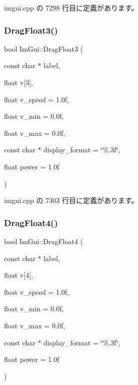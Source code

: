  imgui.\+cpp の 7298 行目に定義があります。

\mbox{\label{namespace_im_gui_a3a365703646c6fb5357f21a13c531bfe}} 
\subsubsection{\texorpdfstring{Drag\+Float3()}{DragFloat3()}}
{\footnotesize\ttfamily bool Im\+Gui\+::\+Drag\+Float3 (\begin{DoxyParamCaption}\item[{const char $\ast$}]{label,  }\item[{float}]{v\mbox{[}3\mbox{]},  }\item[{float}]{v\+\_\+speed = {\ttfamily 1.0f},  }\item[{float}]{v\+\_\+min = {\ttfamily 0.0f},  }\item[{float}]{v\+\_\+max = {\ttfamily 0.0f},  }\item[{const char $\ast$}]{display\+\_\+format = {\ttfamily \char`\"{}\%.3f\char`\"{}},  }\item[{float}]{power = {\ttfamily 1.0f} }\end{DoxyParamCaption})}



 imgui.\+cpp の 7303 行目に定義があります。

\mbox{\label{namespace_im_gui_a6dfd9e5d7adc6106e9391fc971d2f8bc}} 
\subsubsection{\texorpdfstring{Drag\+Float4()}{DragFloat4()}}
{\footnotesize\ttfamily bool Im\+Gui\+::\+Drag\+Float4 (\begin{DoxyParamCaption}\item[{const char $\ast$}]{label,  }\item[{float}]{v\mbox{[}4\mbox{]},  }\item[{float}]{v\+\_\+speed = {\ttfamily 1.0f},  }\item[{float}]{v\+\_\+min = {\ttfamily 0.0f},  }\item[{float}]{v\+\_\+max = {\ttfamily 0.0f},  }\item[{const char $\ast$}]{display\+\_\+format = {\ttfamily \char`\"{}\%.3f\char`\"{}},  }\item[{float}]{power = {\ttfamily 1.0f} }\end{DoxyParamCaption})}



